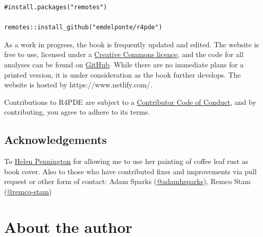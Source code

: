 \documentclass[
  letterpaper,
  DIV=11,
  numbers=noendperiod]{scrreprt}
\begin{document}
\begin{verbatim}
#install.packages("remotes")

remotes::install_github("emdelponte/r4pde")
\end{verbatim}

As a work in progress, the book is frequently updated and edited. The
website is free to use, licensed under a
\href{https://creativecommons.org/licenses/by-nc/4.0/}{Creative Commons
licence}, and the code for all analyses can be found on
\href{https://github.com/emdelponte/epidemiology-R}{GitHub}. While there
are no immediate plans for a printed version, it is under consideration
as the book further develops. The website is hosted by
https://www.netlify.com/.

Contributions to R4PDE are subject to a
\href{https://contributor-covenant.org/version/2/0/CODE_OF_CONDUCT.html}{Contributor
Code of Conduct}, and by contributing, you agree to adhere to its terms.

\hypertarget{acknowledgements}{%
\section*{Acknowledgements}\label{acknowledgements}}


To \href{https://www.hgpenningtonart.co.uk/}{Helen Pennington} for
allowing me to use her painting of coffee leaf rust as book cover. Also
to those who have contributed fixes and improvements via pull request or
other form of contact: Adam Sparks
(\href{https://github.com/adamhsparks}{@adamhsparks}), Remco Stam
(\href{https://github.com/remco-stam}{@remco-stam})


\hypertarget{about-the-author}{%
\chapter*{About the author}\label{about-the-author}}

\end{document}
